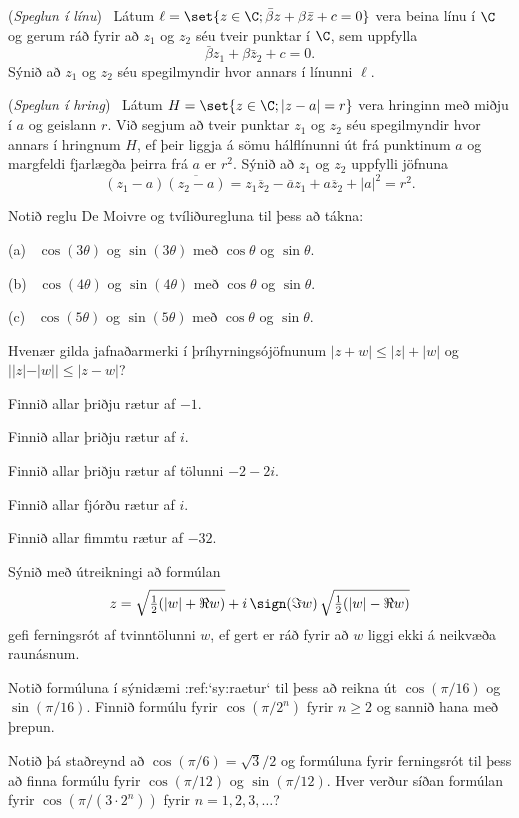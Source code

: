 \daemi ({\it Speglun í línu}) \ Látum $\ell=\set
{z\in \C;  \bar {\beta}z+{\beta}\bar
z+c=0}$ vera beina línu í $\C$ og gerum ráð fyrir að $z_1$ og
$z_2$ séu tveir punktar í $\C$, sem uppfylla 
$$
\bar {\beta} z_1+{\beta}\bar z_2+c=0.
$$
Sýnið að $z_1$ og $z_2$ séu spegilmyndir hvor annars í línunni $\ell$.

\daemi ({\it Speglun í hring}) \ Látum $H=\set{z\in \C; |z-a|=r}$ vera hringinn með miðju í
$a$ og geislann $r$.  Við segjum að tveir punktar $z_1$ og $z_2$ séu
spegilmyndir hvor annars í hringnum $H$, ef þeir liggja á sömu
hálflínunni út frá punktinum $a$ og margfeldi fjarlægða þeirra frá $a$
er $r^2$.  Sýnið að $z_1$ og $z_2$ uppfylli jöfnuna
$$
(z_1-a)\overline{(z_2-a)}=z_1\overline z_2-\overline a z_1+a\overline
z_2 +|a|^2=r^2.
$$

\daemi Notið reglu De Moivre og tvíliðuregluna 
til þess að tákna:

\smallskip\noindent
(a) \ 
$\cos(3\theta)$  
og $\sin (3\theta)$ með  $\cos\theta$ og $\sin \theta$.


\smallskip\noindent
(b) \ $\cos(4\theta)$  
og $\sin (4\theta)$ með  $\cos\theta$ og $\sin \theta$.

\smallskip\noindent
(c) \ $\cos(5\theta)$  
og $\sin (5\theta)$ með  $\cos\theta$ og $\sin \theta$.



\daemi Hvenær gilda jafnaðarmerki í þríhyrningsójöfnunum  
$|z+w| \leq  |z| + |w|$
og $||z|-|w||\leq |z-w|$?


\daemi Finnið allar þriðju rætur af $-1$.

\daemi Finnið allar þriðju rætur af $i$.

\daemi Finnið allar þriðju rætur af tölunni $-2-2i$.

\daemi Finnið allar fjórðu rætur af $i$.

\daemi Finnið allar fimmtu rætur af $-32$.


\daemi Sýnið með útreikningi að formúlan
$$
z=\sqrt{\tfrac 12(|w|+\Re w)}+i\, \sign(\Im w)\, \sqrt{\tfrac
12(|w|-\Re w)}
$$
gefi ferningsrót af tvinntölunni $w$, ef gert er ráð fyrir að 
$w$ liggi ekki á neikvæða raunásnum.


\daemi Notið formúluna í sýnidæmi :ref:`sy:raetur`
til þess að reikna út $\cos(\pi/16)$ og $\sin( \pi/16)$.
Finnið formúlu fyrir $\cos(\pi/2^n)$ fyrir $n\geq 2$ og sannið hana með
þrepun.

\daemi Notið þá staðreynd að $\cos(\pi/6)=\sqrt 3/2$ og formúluna fyrir ferningsrót
til þess að finna formúlu fyrir $\cos(\pi/12)$ og $\sin( \pi/12)$.
Hver verður síðan formúlan fyrir $\cos(\pi/(3\cdot 2^n))$ fyrir
$n=1,2,3,\dots$? 

